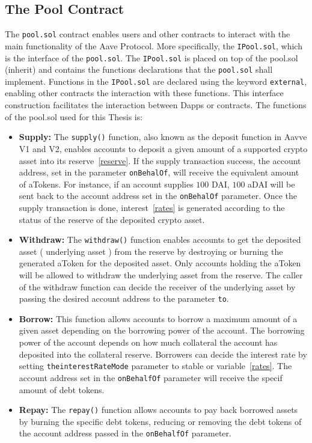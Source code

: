 \documentclass[11pt,a4paper]{report}
\begin{document}
\subsection{The Pool Contract}
The \verb|pool.sol| contract enables users and other contracts to interact with the main functionality of the Aave Protocol. More specifically, the \verb|IPool.sol|, which is the interface of the \verb|pool.sol|. The \verb|IPool.sol| is placed on top of the pool.sol (inherit) and contains the functions declarations that the \verb|pool.sol| shall implement. Functions in the \verb|IPool.sol| are declared using the keyword \verb|external|, enabling other contracts the interaction with these functions. This interface construction facilitates the interaction between Dapps or contracts. The functions of the pool.sol used for this Thesis is: 
\begin{itemize}
	\item{\textbf{Supply:}} The \verb|supply()| function, also known as the deposit function in Aavve V1 and V2, enables accounts to deposit a given amount of a supported crypto asset into its reserve~\ref{reserve}. If the supply transaction success, the account address, set in the parameter \verb|onBehalOf|, will receive the equivalent amount of aTokens. For instance, if an account supplies $100$ DAI, $100$ aDAI will be sent back to the account address set in the \verb|onBehalOf| parameter. Once the supply transaction is done, interest~\ref{rates} is generated according to the status of the reserve of the deposited crypto asset.
	\item{\textbf{Withdraw:}} The \verb|withdraw()| function enables accounts to get the deposited asset ( underlying asset ) from the reserve by destroying or burning the generated aToken for the deposited asset. Only accounts holding the aToken will be allowed to withdraw the underlying asset from the reserve. The caller of the withdraw function can decide the receiver of the underlying asset by passing the desired account address to the parameter \verb|to|.
	\item{\textbf{Borrow:}} This function allows accounts to borrow a maximum amount of a given asset depending on the borrowing power of the account. The borrowing power of the account depends on how much collateral the account has deposited into the collateral reserve. Borrowers can decide the interest rate by setting \verb|theinterestRateMode| parameter to stable or variable~\ref{rates}. The account address set in the \verb|onBehalfOf| parameter will receive the specif amount of debt tokens.
	\item{\textbf{Repay:}} The \verb|repay()| function allows accounts to pay back borrowed assets by burning the specific debt tokens, reducing or removing the debt tokens of the account address passed in the \verb|onBehalfOf| parameter. 	
\end{itemize}
\end{document}
